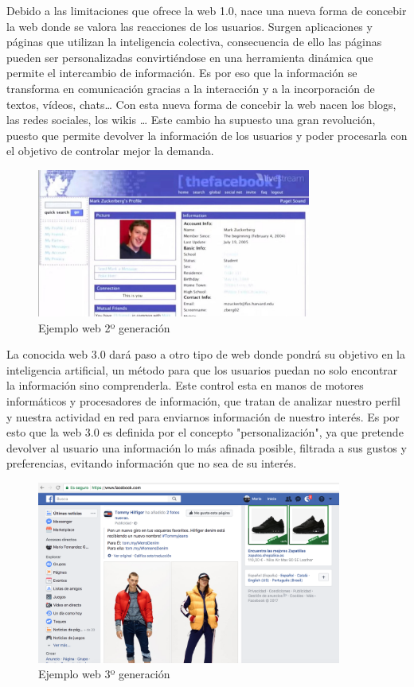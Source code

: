 Debido a las limitaciones que ofrece la web 1.0, nace una nueva forma de concebir la web donde se valora las reacciones de los usuarios. Surgen aplicaciones y páginas que utilizan la inteligencia colectiva, consecuencia de ello las páginas pueden ser personalizadas convirtiéndose en una herramienta dinámica que permite el intercambio de información. Es por eso que la información se transforma en comunicación gracias a la interacción y a la incorporación de textos, vídeos, chats… Con esta nueva forma de concebir la web nacen los blogs, las redes sociales, los wikis … Este cambio ha supuesto una gran revolución, puesto que permite devolver la información de los usuarios y poder procesarla con el objetivo de controlar mejor la demanda.


\begin{figure}[!h]
    \centering
    \includegraphics[width=90mm]{img/introduccion/web2.jpeg}
    \caption{Ejemplo web 2º generación}
\end{figure}

La conocida web 3.0 dará paso a otro tipo de web donde pondrá su objetivo en la inteligencia artificial, un método para que los usuarios puedan no solo encontrar la información sino comprenderla. Este control esta en manos de motores informáticos y procesadores de información, que tratan de analizar nuestro perfil y nuestra actividad en red para enviarnos información de nuestro interés.
Es por esto que la web 3.0 es definida por el concepto "personalización", ya que pretende devolver al usuario una información lo más afinada posible, filtrada a sus gustos y preferencias, evitando información que no sea de su interés.

\begin{figure}[!h]
    \centering
    \includegraphics[width=100mm]{img/introduccion/facebook.png}
    \caption{Ejemplo web 3º generación}
\end{figure}

